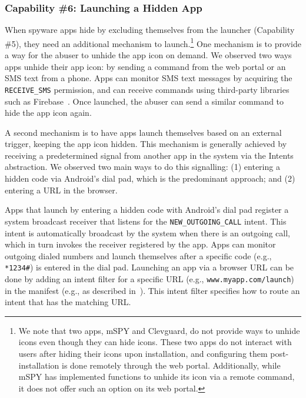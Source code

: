\subsubsection*{Capability \#6: Launching a Hidden App}
\label{subsubsec:launch_hidden_app}
When spyware apps hide by excluding themselves from the launcher
(Capability \#5), they need an additional mechanism to launch.\footnote{We note that two apps, mSPY and Clevguard, do not provide ways to unhide icons even though they can hide icons.
These two apps do not interact with users after hiding their icons upon installation, and configuring them post-installation is done remotely through the web portal. Additionally, while mSPY has implemented functions to unhide its icon via a remote command, it does not offer such an option on its web portal.}  One
mechanism is to provide a way for the abuser to unhide the app icon on
demand.  We observed two ways apps unhide their app icon: by sending a
command from the web portal or an SMS text from a phone. Apps can
monitor SMS text messages by acquiring the \texttt{RECEIVE\_SMS}
permission, and can receive commands using third-party libraries such
as Firebase~\cite{Firebase21:online}.  Once launched, the abuser
can send a similar command to hide the app icon again.

A second mechanism is to have apps
launch themselves based on an external trigger,
keeping the app icon hidden.
This mechanism is generally achieved by
receiving a predetermined signal from another app in the system via the Intents
abstraction. We observed two main ways to do this signalling: (1) entering a hidden code via
Android's dial pad, which is the predominant approach; and (2) entering a URL in
the browser.

Apps that launch by entering a hidden code with Android's dial pad
register a system broadcast receiver that listens for the
\texttt{NEW\_OUTGOING\_CALL} intent. This intent is automatically broadcast by
the system when there is an outgoing call, which in turn invokes the receiver
registered by the app.  Apps can monitor outgoing dialed numbers and launch
themselves after a specific code (e.g.,
\texttt{*1234\#}) is entered in the dial pad.
Launching an app via a browser URL can be done by
adding an intent filter for a specific URL (e.g.,
\texttt{www.myapp.com/launch}) in the manifest (e.g., as described in~\cite{CreateDe16:online}). This intent filter specifies how to route an
intent that has the matching URL.

